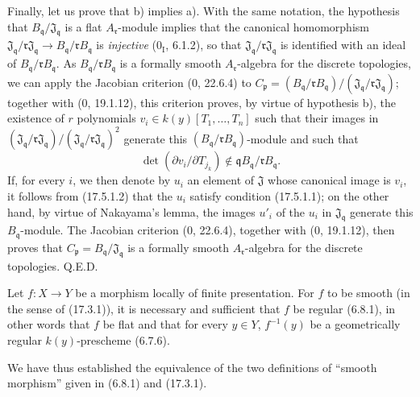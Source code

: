 Finally, let us prove that b) implies a). With the same notation, the hypothesis that $B_{\mathfrak q}/\mathfrak J_{\mathfrak q}$ is a flat $A_{\mathfrak r}$-module implies that the canonical homomorphism $\mathfrak J_{\mathfrak q}/\mathfrak r\mathfrak J_{\mathfrak q}\to B_{\mathfrak q}/\mathfrak rB_{\mathfrak q}$ is \emph{injective} ($0_{\mathrm I}$, 6.1.2), so that $\mathfrak J_{\mathfrak q}/\mathfrak r\mathfrak J_{\mathfrak q}$ is identified with an ideal of $B_{\mathfrak q}/\mathfrak rB_{\mathfrak q}$. As $B_{\mathfrak q}/\mathfrak rB_{\mathfrak q}$ is a formally smooth $A_{\mathfrak r}$-algebra for the discrete topologies, we can apply the Jacobian criterion (0, 22.6.4) to $C_{\mathfrak p}=(B_{\mathfrak q}/\mathfrak rB_{\mathfrak q})/(\mathfrak J_{\mathfrak q}/\mathfrak r\mathfrak J_{\mathfrak q})$; together with (0, 19.1.12), this criterion proves, by virtue of hypothesis b), the existence of $r$ polynomials $v_i\in k(y)[T_1,\ldots,T_n]$ such that their images in $(\mathfrak J_{\mathfrak q}/\mathfrak r\mathfrak J_{\mathfrak q})/(\mathfrak J_{\mathfrak q}/\mathfrak r\mathfrak J_{\mathfrak q})^2$ generate this $(B_{\mathfrak q}/\mathfrak rB_{\mathfrak q})$-module and such that
\[
\label{IV.17.5.1.2}
\det(\partial v_i/\partial T_{j_k})\notin\mathfrak qB_{\mathfrak q}/\mathfrak rB_{\mathfrak q}.
\tag{17.5.1.2}
\]
If, for every $i$, we then denote by $u_i$ an element of $\mathfrak J$ whose canonical image is $v_i$, it follows from (17.5.1.2) that the $u_i$ satisfy condition (17.5.1.1); on the other hand, by virtue of Nakayama's lemma, the images $u'_i$ of the $u_i$ in $\mathfrak J_{\mathfrak q}$ generate this $B_{\mathfrak q}$-module. The Jacobian criterion (0, 22.6.4), together with (0, 19.1.12), then proves that $C_{\mathfrak p}=B_{\mathfrak q}/\mathfrak J_{\mathfrak q}$ is a formally smooth $A_{\mathfrak r}$-algebra for the discrete topologies. Q.E.D.

\begin{corollary}[17.5.2]
\label{IV.17.5.2}
Let $f:X\to Y$ be a morphism locally of finite presentation. For $f$ to be smooth (in the sense of (17.3.1)), it is necessary and sufficient that $f$ be regular (6.8.1), in other words that $f$ be flat and that for every $y\in Y$, $f^{-1}(y)$ be a geometrically regular $k(y)$-prescheme (6.7.6).
\end{corollary}

We have thus established the equivalence of the two definitions of ``smooth morphism'' given in (6.8.1) and (17.3.1).

